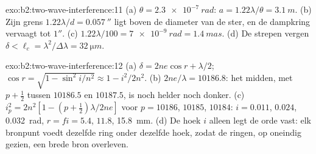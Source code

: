 \begin{solution}{exo:b2:two-wave-interference:11}
(a) $\theta = \qty{2.3e-7}{rad}$: $a = 1.22\lambda/\theta = \qty{3.1}{m}$.
(b) Zijn grens $1.22\lambda/d =
\qty{0.057}{''}$ ligt boven de diameter van
de ster, en de dampkring vervaagt
tot $1''$. (c) $1.22\lambda/100 = \qty{7e-9}{rad} = \qty{1.4}{mas}$. (d) De
strepen vergen
$\delta < \ell_c = \lambda^2/\Delta\lambda = \qty{32}{\micro m}$.
\end{solution}

\begin{solution}{exo:b2:two-wave-interference:12}
(a) $\delta = 2ne\cos r + \lambda/2$;
$\cos r = \sqrt{1 - \sin^2i/n^2} \approx 1 - i^2/2n^2$.
(b) $2ne/\lambda = 10186.8$: het midden, met $p + \tfrac12$ tussen $10186.5$ en
$10187.5$, is noch helder noch donker. (c)
$i_p^2 = 2n^2[1 - (p + \tfrac12)\lambda/
2ne]$ voor $p = 10186$, $10185$,
$10184$: $i = 0.011$, $0.024$, \qty{0.032}{rad}, $r = fi
= 5.4$, $11.8$,
\qty{15.8}{mm}. (d) De hoek $i$ alleen legt de orde vast: elk
bronpunt voedt dezelfde ring onder dezelfde hoek, zodat de ringen, op
oneindig gezien, een brede bron overleven.
\end{solution}

